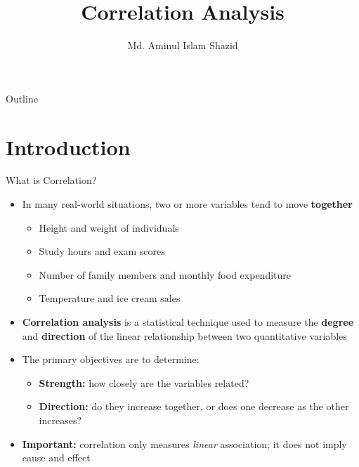 \documentclass[12pt, aspectratio=169]{beamer}
\title{Correlation Analysis}
\author{Md. Aminul Islam Shazid}
\date{}
\begin{document}
    {
        \addtocounter{framenumber}{-2}

        \begin{frame}
            \titlepage
        \end{frame}

        \begin{frame}{Outline}
            \vfill
            \tableofcontents[subsectionstyle=hide]
            \vfill
        \end{frame}
    }


    \section{Introduction}


    \begin{frame}{What is Correlation?}
        \begin{itemize}
            \item In many real-world situations, two or more variables tend to
                move \textbf{together}
            \begin{itemize}
                \item Height and weight of individuals
                \item Study hours and exam scores
                \item Number of family members and monthly food expenditure
                \item Temperature and ice cream sales
            \end{itemize}
            \item \textbf{Correlation analysis} is a statistical technique used to
                measure the \textbf{degree} and \textbf{direction} of the linear
                relationship between two quantitative variables
            \item The primary objectives are to determine:
            \begin{itemize}
                \item \textbf{Strength:} how closely are the variables related?
                \item \textbf{Direction:} do they increase together, or does one
                    decrease as the other increases?
            \end{itemize}
            \item \textbf{Important:} correlation only measures \emph{linear}
                association; it does not imply cause and effect
        \end{itemize}
    \end{frame}
\end{document}
